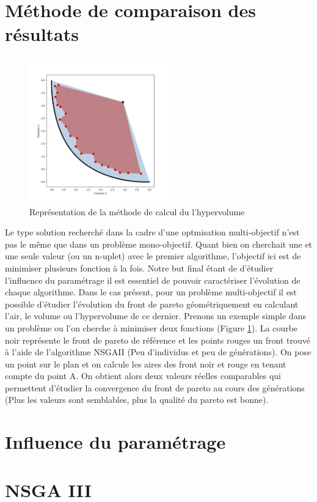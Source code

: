 \documentclass[12pt]{report}
\begin{document}
    \section{Méthode de comparaison des résultats}
      \begin{figure}
        \centering
        \includegraphics[width=6cm]{img/hypervolume.png}
        \caption{Représentation de la méthode de calcul du l'hypervolume}
        \label{hypervolume}
      \end{figure}
      Le type solution recherché dans la cadre d'une optmisation multi-objectif n'est pas le même que dans un problème mono-objectif. Quant bien on cherchait une et une seule valeur (ou un n-uplet) avec le premier algorithme, l'objectif ici est de minimiser plusieurs fonction à la fois. Notre but final étant de d'étudier l'influence du paramétrage il est essentiel de pouvoir caractériser l'évolution de chaque algorithme. Dans le cas présent, pour un problème multi-objectif il est possible d'étudier l'évolution du front de pareto géométriquement en calculant l'air, le volume ou l'hypervolume de ce dernier.
      Prenons un exemple simple dans un problème ou l'on cherche à minimiser deux fonctions (Figure \ref{hypervolume}). La courbe noir représente le front de pareto de référence et les points rouges un front trouvé à l'aide de l'algorithme NSGAII (Peu d'individus et peu de générations). On pose un point sur le plan et on calcule les aires des front noir et rouge en tenant compte du point A. On obtient alors deux valeurs réelles comparables qui permettent d'étudier la convergence du front de pareto au cours des générations (Plus les valeurs sont semblables, plus la qualité du pareto est bonne).
    \section{Influence du paramétrage}
    \section{NSGA III}
\end{document}
